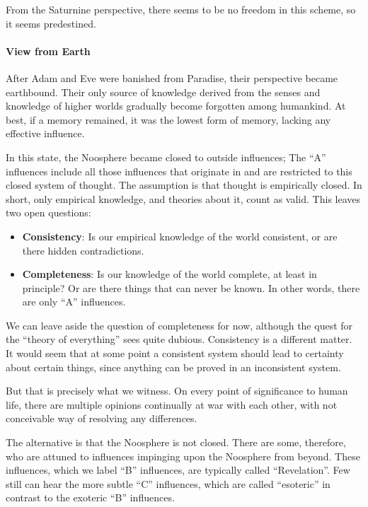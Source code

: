 From the Saturnine perspective, there seems to be no freedom in this scheme, so it seems predestined.

\paragraph{View from Earth}


After Adam and Eve were banished from Paradise, their perspective became earthbound. Their only source of knowledge derived from the senses and knowledge of higher worlds gradually become forgotten among humankind. At best, if a memory remained, it was the lowest form of memory, lacking any effective influence.

In this state, the Noosphere became closed to outside influences; The ``A'' influences include all those influences that originate in and are restricted to this closed system of thought. The assumption is that thought is empirically closed. In short, only empirical knowledge, and theories about it, count as valid. This leaves two open questions:

\begin{itemize}


\item \textbf{Consistency}: Is our empirical knowledge of the world consistent, or are there hidden contradictions.

\item \textbf{Completeness}: Is our knowledge of the world complete, at least in principle? Or are there things that can never be known. In other words, there are only ``A'' influences.
\end{itemize}


We can leave aside the question of completeness for now, although the quest for the ``theory of everything'' sees quite dubious. Consistency is a different matter. It would seem that at some point a consistent system should lead to certainty about certain things, since anything can be proved in an inconsistent system.

But that is precisely what we witness. On every point of significance to human life, there are multiple opinions continually at war with each other, with not conceivable way of resolving any differences.

The alternative is that the Noosphere is not closed. There are some, therefore, who are attuned to influences impinging upon the Noosphere from beyond. These influences, which we label ``B'' influences, are typically called ``Revelation''. Few still can hear the more subtle ``C'' influences, which are called ``esoteric'' in contrast to the exoteric ``B'' influences.

